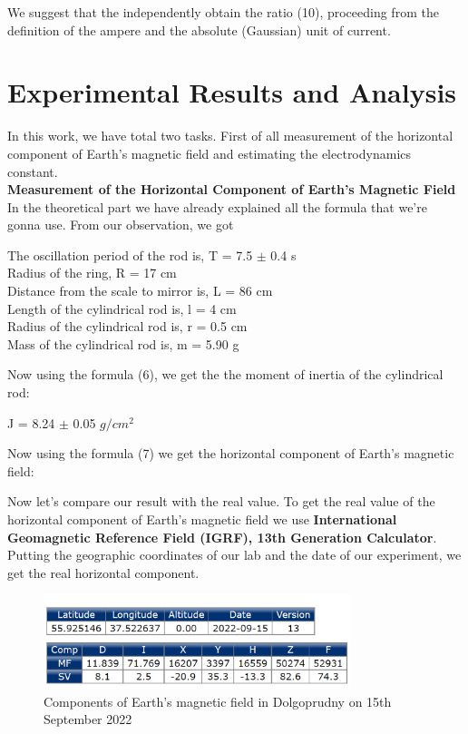 \documentclass[a4paper, 12pt]{article}%
\begin{document}
We suggest that the independently obtain the ratio (10), proceeding from the definition of the ampere and the absolute (Gaussian) unit of current.

\section{Experimental Results and Analysis}
In this work, we have total two tasks. First of all measurement of the horizontal component of Earth's magnetic field and estimating the electrodynamics constant.\\
\newline
\textbf{Measurement of the Horizontal Component of Earth's Magnetic Field}
In the theoretical part we have already explained all the formula that we're gonna use. From our observation, we got

\begin{center}
The oscillation period of the rod is, T = 7.5 $\pm$ 0.4 s\\
Radius of the ring, R = 17 cm\\
Distance from the scale to mirror is, L = 86 cm\\
Length of the cylindrical rod is, l = 4 cm\\
Radius of the cylindrical rod is, r = 0.5 cm\\
Mass of the cylindrical rod is, m = 5.90 g\\
\end{center}
Now using the formula (6), we get the the moment of inertia of the cylindrical rod:

\begin{center}
J = 8.24 $\pm$ 0.05 $g/cm^2$
\end{center}
Now using the formula (7) we get the horizontal component of Earth's magnetic field:

\begin{center}
\end{center}

Now let's compare our result with the real value. To get the real value of the horizontal component of Earth's magnetic field we use  \textbf{International Geomagnetic Reference Field (IGRF), 13th Generation Calculator}. Putting the geographic coordinates of our lab and the date of our experiment, we get the real horizontal component.  
\begin{figure}[h]
\begin{center}
\includegraphics[width = 0.8\textwidth]{Fig4.png}
\caption{Components of Earth's magnetic field in Dolgoprudny on 15th September 2022 }
\end{center}
\end{figure}
\end{document}
